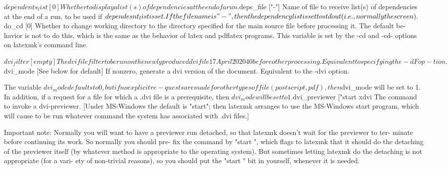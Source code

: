        $dependents_list [0]
              Whether  to  display  a  list(s) of dependencies at the end of a
              run.

       $deps_file ["-"]
              Name of file to receive list(s) of dependencies at the end of  a
              run,  to be used if $dependesnt_list is set.  If the filename is
              "-", then the dependency list is set to stdout  (i.e.,  normally
              the screen).

       $do_cd [0]
              Whether  to  change working directory to the directory specified
              for the main source file before processing it.  The default  be-
              havior  is  not to do this, which is the same as the behavior of
              latex and pdflatex programs.  This variable is set  by  the  -cd
              and -cd- options on latexmk's command line.

       $dvi_filter [empty]
              The  dvi  file  filter  to be run on the newly produced dvi file



                                 17 April 2020                              40








              before other processing.  Equivalent to specifying the  -dF  op-
              tion.

       $dvi_mode [See below for default]
              If  nonzero, generate a dvi version of the document.  Equivalent
              to the -dvi option.

              The variable $dvi_mode defaults to 0, but  if  no  explicit  re-
              quests  are made for other types of file (postscript, pdf), then
              $dvi_mode will be set to 1.  In addition, if  a  request  for  a
              file  for  which  a  .dvi file is a prerequisite, then $dvi_mode
              will be set to 1.

       $dvi_previewer ["start xdvi %
              The command to invoke a dvi-previewer.   [Under  MS-Windows  the
              default  is "start"; then latexmk arranges to use the MS-Windows
              start program, which will cause to be run whatever  command  the
              system has associated with .dvi files.]

              Important  note:  Normally you will want to have a previewer run
              detached, so that latexmk doesn't wait for the previewer to ter-
              minate  before continuing its work.  So normally you should pre-
              fix the command by "start ", which  flags  to  latexmk  that  it
              should  do  the  detaching  of the previewer itself (by whatever
              method is appropriate to the operating system).   But  sometimes
              letting latexmk do the detaching is not appropriate (for a vari-
              ety of non-trivial reasons), so you should put the "start "  bit
              in yourself, whenever it is needed.

